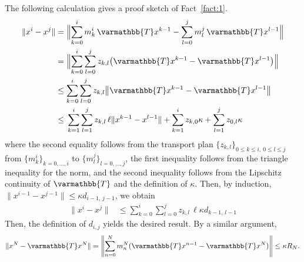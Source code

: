\documentclass[pdflatex,sn-mathphys-num]{sn-jnl}%
\newcommand{\opT}{{\varmathbb{T}}}
\theoremstyle{thmstyleone}%
\theoremstyle{thmstyletwo}%
\theoremstyle{thmstylethree}%
\begin{document}
The following calculation gives a proof sketch of Fact~\ref{fact:1}.
\begin{align*}
\|x^{i}-x^{j}\|
&=\Bigl\|\sum^i_{k=0}m^i_k\,\opT x^{k-1}-\sum^j_{l=0}m^j_l\,\opT x^{l-1}\Bigr\|\\
&= \Bigl\| \sum_{k=0}^{i}\sum_{l=0}^{j} z_{k,l}\bigl(\opT x^{k-1}-\opT x^{l-1}\bigr) \Bigr\| \\
&\le  \sum_{k=0}^{i}\sum_{l=0}^{j} z_{k,l}\bigl\|\opT x^{k-1}-\opT x^{l-1}\bigr\|\\
&\le \begin{aligned}[t]
&\sum_{k=1}^{i}\sum_{l=1}^{j} z_{k,l}\, \ell \|x^{k-1}-x^{l-1}\|+\sum_{k=1}^{i} z_{k,0}\kappa+\sum_{l=1}^{j} z_{0,l}\kappa
\end{aligned}
\end{align*}
where the second equality follows from the transport plan $\{z_{k,l}\}_{0\le k\le i,\ 0\le l\le j}$ from $\{m^i_{k}\}_{k=0,\dots, i}$ to $\{m^j_l\}_{l=0,\dots, j}$,
the first inequality follows from the triangle inequality for the norm,
and the second inequality follows from the Lipschitz continuity of \(\opT\) and the definition of $\kappa$.
Then, by induction, \(\|x^{i-1}-x^{j-1}\| \le \kappa d_{i-1,\,j-1}\), we obtain
\begin{align*}
\|x^{i}-x^{j}\|
&\le \sum_{k=0}^{i}\sum_{l=0}^{j} z_{k,l}\,\ell \kappa d_{k-1,\,l-1}
\end{align*}
Then, the definition of $d_{i,j}$ yields the desired result. By a similar argument,
\begin{align*}
\|x^N-\opT x^N\|
= \left\|\sum^N_{n=0}m^N_n(\opT x^{n-1}-\opT x^N) \right\|
\le \kappa R_N.
\end{align*}
\end{document}
